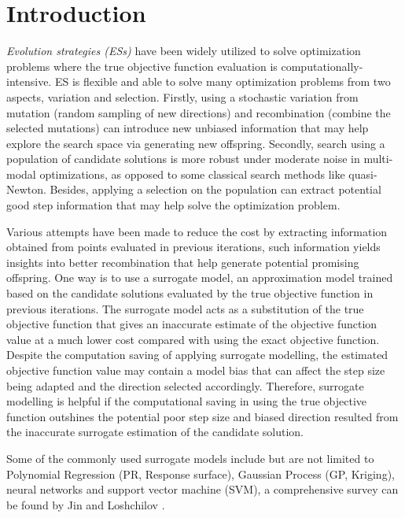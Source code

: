 \section{Introduction}

\textit{Evolution strategies (ESs)} have been widely utilized to solve optimization problems where the true objective function evaluation is computationally-intensive. ES is flexible and able to solve many optimization problems from two aspects, variation and selection. Firstly, using a stochastic variation from mutation (random sampling of new directions) and recombination (combine the selected mutations) can introduce new unbiased information that may help explore the search space via generating new offspring. Secondly, search using a population of candidate solutions is more robust under moderate noise in multi-modal optimizations, as opposed to some classical search methods like quasi-Newton. Besides, applying a selection on the population can extract potential good step information that may help solve the optimization problem. 

Various attempts have been made to reduce the cost by extracting information obtained from points evaluated in previous iterations, such information yields insights into better recombination that help generate potential promising offspring. One way is to use a surrogate model, an approximation model trained based on the candidate solutions evaluated by the true objective function in previous iterations. The surrogate model acts as a substitution of the true objective function that gives an inaccurate estimate of the objective function value at a much lower cost compared with using the exact objective function. Despite the computation saving of applying surrogate modelling, the estimated objective function value may contain a model bias that can affect the step size being adapted and the direction selected accordingly. Therefore, surrogate modelling is helpful if the computational saving in using the true objective function outshines the potential poor step size and biased direction resulted from the inaccurate surrogate estimation of the candidate solution. 

Some of the commonly used surrogate models include but are not limited to Polynomial Regression (PR, Response surface), Gaussian Process (GP, Kriging), neural networks and support vector machine (SVM), a comprehensive survey can be found by Jin \cite{JIN201161} and Loshchilov \cite{ECJ2016_LMCMA}.  

